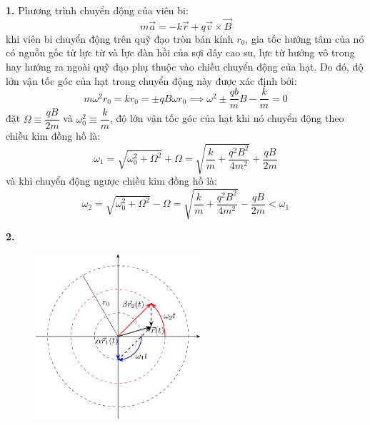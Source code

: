 \noindent\textbf{1.} Phương trình chuyển động của viên bi:
\begin{equation*}
  m\vec{a}=-k\vec{r}+q\vec{v}\times\vec{B}
\end{equation*}
khi viên bi chuyển động trên quỹ đạo tròn bán kính $r_{0}$, gia tốc hướng tâm của nó có nguồn gốc từ lực từ và lực đàn hồi của sợi dây cao su, lực từ hướng vô trong hay hướng ra ngoài quỹ đạo phụ thuộc vào chiều chuyển động của hạt. Do đó, độ lớn vận tốc góc của hạt trong chuyển động này được xác định bởi:
\begin{equation*}
  m\omega^{2}r_{0}=kr_{0}=\pm qB\omega r_{0}\implies\omega^{2}\pm\frac{qb}{m}B-\frac{k}{m}=0
\end{equation*}
đặt $\Omega\equiv\dfrac{qB}{2m}$ và $\omega_{0}^{2}\equiv\dfrac{k}{m}$, độ lớn vận tốc góc của hạt khi nó chuyển động theo chiều kim đồng hồ là:
\begin{equation*}
  \omega_{1}=\sqrt{\omega_{0}^{2}+\Omega^{2}}+\Omega=\sqrt{\frac{k}{m}+\frac{q^{2}B^{2}}{4m^{2}}}+\frac{qB}{2m}
\end{equation*}
và khi chuyển động ngược chiều kim đồng hồ là:
\begin{equation*}
  \omega_{2}=\sqrt{\omega_{0}^{2}+\Omega^{2}}-\Omega=\sqrt{\frac{k}{m}+\frac{q^{2}B^{2}}{4m^{2}}}-\frac{qB}{2m}<\omega_{1}
\end{equation*}

\noindent\textbf{2.}
\begin{figure}[h]
  \centering
  \includegraphics[width=0.55\textwidth]{Figures/Fig 1S1.jpg}
\end{figure}


